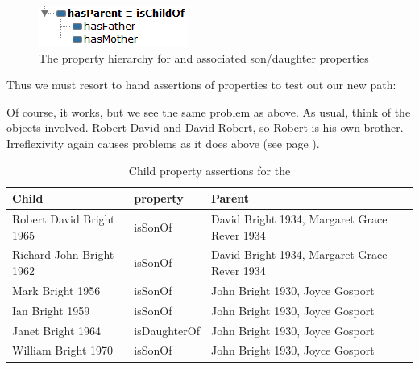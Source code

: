 	
\begin{figure}
\begin{center}
\includegraphics[width=\figwidth]{figures/new/childof_property.PNG}\caption{The property hierarchy for  and associated son/daughter properties}\label{fig:childof}
\end{center}
\end{figure}

Thus we must resort to hand assertions of properties to test out our new path:

Of course, it works, but we see the same problem as above. As usual, think of the objects involved. Robert  David and David  Robert, so Robert is his own brother.{\herebedragons} Irreflexivity again causes problems as it does above (see page \pageref{pg:irreflexive}).

\begin{table}
\caption{\label{tab:sibs2}Child property assertions for the \fhkb}
\begin{tabular}{|l|l|l|}
\hline
Child & property & Parent \\
\hline
Robert David Bright 1965 & isSonOf & David Bright 1934, Margaret Grace Rever 1934 \\
Richard John Bright 1962 & isSonOf & David Bright 1934, Margaret Grace Rever 1934 \\
Mark Bright 1956 & isSonOf & John Bright 1930, Joyce Gosport \\
Ian Bright 1959 & isSonOf & John Bright 1930, Joyce Gosport \\
Janet Bright 1964 & isDaughterOf & John Bright 1930, Joyce Gosport \\
William Bright 1970 & isSonOf & John Bright 1930, Joyce Gosport \\
\hline
\end{tabular}
\end{table}

